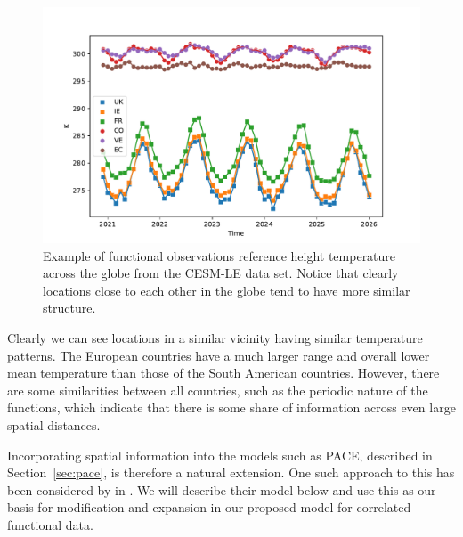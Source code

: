  \begin{figure}[htbp!] 
	\centering    
	\includegraphics[width=1.0\textwidth]{TREFHT_example_space_temp}
	\caption[CESM example of spatial correlation]{Example of functional observations reference height temperature across the globe from the CESM-LE data set. Notice that clearly locations close to each other in the globe tend to have more similar structure.}
	\label{fig:cesm-space}
\end{figure}
Clearly we can see locations in a similar vicinity having similar temperature patterns.
The European countries have a much larger range and overall lower mean temperature than those of the South American countries.
However, there are some similarities between all countries, such as the periodic nature of the functions, which indicate that there is some share of information across even large spatial distances. 

Incorporating spatial information into the models such as PACE, described in Section~\ref{sec:pace}, is therefore a natural extension. 
One such approach to this has been considered by \citeauthor{liu_functional_2017} in \citep{liu_functional_2017}. 
We will describe their model below and use this as our basis for modification and expansion in our proposed model for correlated functional data.

